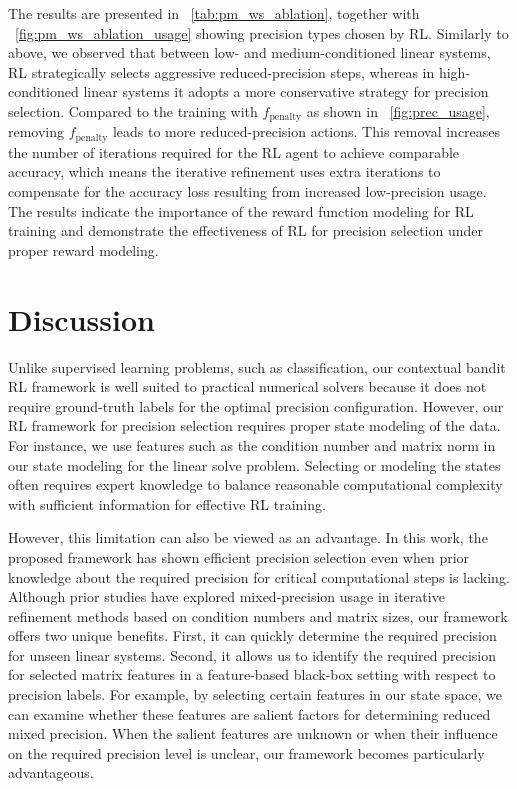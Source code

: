 \documentclass[Afour,sageh,times]{sagej}
\newcommand{\xy}[1]{{\color{black}{#1}}}
\theoremstyle{plain}
\theoremstyle{definition}
\begin{document}
The results are presented in \tablename~\ref{tab:pm_ws_ablation}, together with \figurename~\ref{fig:pm_ws_ablation_usage} showing precision types chosen by RL. Similarly to above, we observed that between low- and medium-conditioned linear systems, RL strategically selects aggressive reduced-precision steps, whereas in high-conditioned linear systems it adopts a more conservative strategy for precision selection. Compared to the training with $f_{\text{penalty}}$ as shown in \figurename~\ref{fig:prec_usage}, removing $f_{\text{penalty}}$ leads to more reduced-precision actions. This removal increases the number of iterations required for the RL agent to achieve comparable accuracy, which means the iterative refinement uses extra iterations to compensate for the accuracy loss resulting from increased low-precision usage. The results indicate the importance of the reward function modeling for RL training and demonstrate the effectiveness of RL for precision selection under proper reward modeling.



\section{Discussion}
Unlike supervised learning problems, such as classification, our contextual bandit RL framework is well suited to practical numerical solvers because it does not require ground-truth labels for the optimal precision configuration. \xy{The reference solution used in the training reward is only used to evaluate the numerical error produced by a sampled precision action; it is not a label specifying which precision configuration should be chosen.} However, our RL framework for precision selection requires proper state modeling of the data. For instance, we use features such as the condition number and matrix norm in our state modeling for the linear solve problem. Selecting or modeling the states often requires expert knowledge to balance reasonable computational complexity with sufficient information for effective RL training.

However, this limitation can also be viewed as an advantage. In this work, the proposed framework has shown efficient precision selection even when prior knowledge about the required precision for critical computational steps is lacking. Although prior studies have explored mixed-precision usage in iterative refinement methods based on condition numbers and matrix sizes, our framework offers two unique benefits. First, it can quickly determine the required precision for unseen linear systems. Second, it allows us to identify the required precision for selected matrix features in a feature-based black-box setting with respect to precision labels. For example, by selecting certain features in our state space, we can examine whether these features are salient factors for determining reduced mixed precision. When the salient features are unknown or when their influence on the required precision level is unclear, our framework becomes particularly advantageous.
\end{document}
